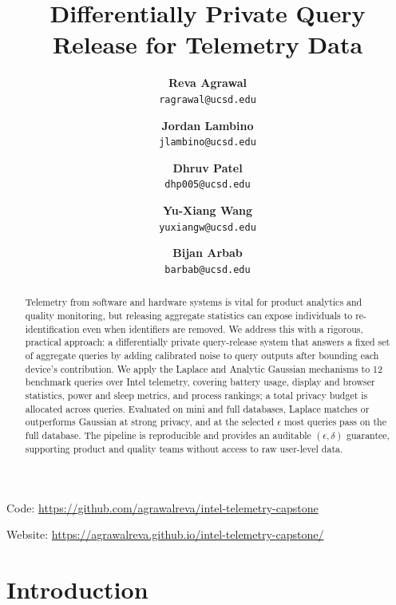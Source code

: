 \documentclass[12pt,letterpaper]{article}
\title{Differentially Private Query Release for Telemetry Data}
\author{
\textbf{Reva Agrawal} \\
{\tt ragrawal@ucsd.edu}
\and
\textbf{Jordan Lambino} \\
{\tt jlambino@ucsd.edu}
\and
\textbf{Dhruv Patel} \\
{\tt dhp005@ucsd.edu}
\and
\textbf{Yu-Xiang Wang} \\
{\tt yuxiangw@ucsd.edu}
\and
\textbf{Bijan Arbab} \\
{\tt barbab@ucsd.edu}
}
\begin{document}
\maketitle


\begin{abstract}
Telemetry from software and hardware systems is vital for product analytics and quality monitoring, but releasing aggregate statistics can expose individuals to re-identification even when identifiers are removed. We address this with a rigorous, practical approach: a differentially private query-release system that answers a fixed set of aggregate queries by adding calibrated noise to query outputs after bounding each device's contribution. We apply the Laplace and Analytic Gaussian mechanisms to 12 benchmark queries over Intel telemetry, covering battery usage, display and browser statistics, power and sleep metrics, and process rankings; a total privacy budget is allocated across queries. Evaluated on mini and full databases, Laplace matches or outperforms Gaussian at strong privacy, and at the selected $\epsilon$ most queries pass on the full database. The pipeline is reproducible and provides an auditable $(\epsilon,\delta)$ guarantee, supporting product and quality teams without access to raw user-level data.
\end{abstract}

\begin{center}
Code: \url{https://github.com/agrawalreva/intel-telemetry-capstone}

Website: \url{https://agrawalreva.github.io/intel-telemetry-capstone/}
\end{center}

\clearpage
\maketoc
\newpage


\section{Introduction}
\end{document}
